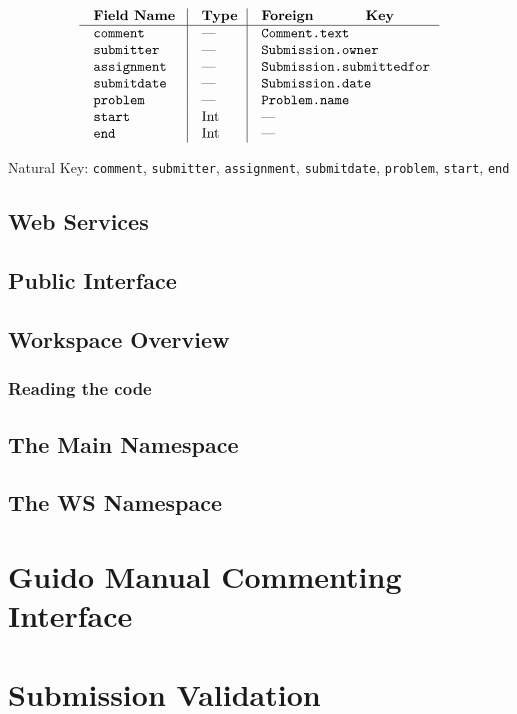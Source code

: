 $$\vbox{
  \offinterlineskip
  \halign{
    \strut \quad {\tt #}  & \vrule\quad #  & \vrule\quad # \cr
    {\bf Field Name}  & {\bf Type}  & {\bf Foreign Key}\cr
    \noalign{\hrule}    
    comment  & ---  & {\tt Comment.text} \cr
    submitter  & ---  & {\tt Submission.owner} \cr
    assignment  & ---  & {\tt Submission.submittedfor} \cr
    submitdate  & ---  & {\tt Submission.date} \cr
    problem  & ---  & {\tt Problem.name} \cr
    start  & Int  & --- \cr
    end  & Int  & --- \cr
  }
}$$

{\noindent
Natural Key: {\tt comment}, {\tt submitter}, {\tt assignment},
{\tt submitdate}, {\tt problem}, {\tt start}, {\tt end}\par}

\section{Web Services}

\section{Public Interface}

\section{Workspace Overview}

\subsection{Reading the code}

\section{The Main Namespace}

\section{The WS Namespace}

\chapter{Guido Manual Commenting Interface}

\chapter{Submission Validation}

